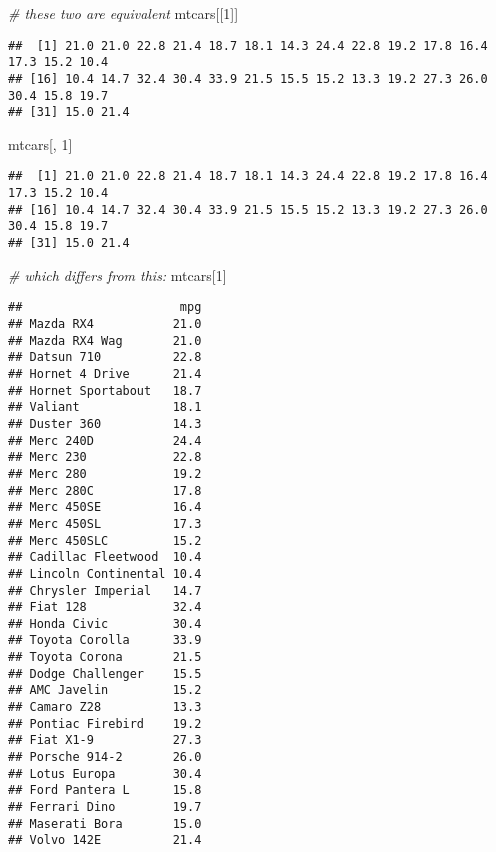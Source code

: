\documentclass[
]{book}
\newenvironment{Shaded}{\begin{snugshade}}{\end{snugshade}}
\newcommand{\CommentTok}[1]{\textcolor[rgb]{0.56,0.35,0.01}{\textit{#1}}}
\newcommand{\DecValTok}[1]{\textcolor[rgb]{0.00,0.00,0.81}{#1}}
\newcommand{\NormalTok}[1]{#1}
\begin{document}
\begin{Shaded}
\begin{Highlighting}[]
\CommentTok{\# these two are equivalent}
\NormalTok{mtcars[[}\DecValTok{1}\NormalTok{]]}
\end{Highlighting}
\end{Shaded}

\begin{verbatim}
##  [1] 21.0 21.0 22.8 21.4 18.7 18.1 14.3 24.4 22.8 19.2 17.8 16.4 17.3 15.2 10.4
## [16] 10.4 14.7 32.4 30.4 33.9 21.5 15.5 15.2 13.3 19.2 27.3 26.0 30.4 15.8 19.7
## [31] 15.0 21.4
\end{verbatim}

\begin{Shaded}
\begin{Highlighting}[]
\NormalTok{mtcars[, }\DecValTok{1}\NormalTok{]}
\end{Highlighting}
\end{Shaded}

\begin{verbatim}
##  [1] 21.0 21.0 22.8 21.4 18.7 18.1 14.3 24.4 22.8 19.2 17.8 16.4 17.3 15.2 10.4
## [16] 10.4 14.7 32.4 30.4 33.9 21.5 15.5 15.2 13.3 19.2 27.3 26.0 30.4 15.8 19.7
## [31] 15.0 21.4
\end{verbatim}

\begin{Shaded}
\begin{Highlighting}[]
\CommentTok{\# which differs from this:}
\NormalTok{mtcars[}\DecValTok{1}\NormalTok{]}
\end{Highlighting}
\end{Shaded}

\begin{verbatim}
##                      mpg
## Mazda RX4           21.0
## Mazda RX4 Wag       21.0
## Datsun 710          22.8
## Hornet 4 Drive      21.4
## Hornet Sportabout   18.7
## Valiant             18.1
## Duster 360          14.3
## Merc 240D           24.4
## Merc 230            22.8
## Merc 280            19.2
## Merc 280C           17.8
## Merc 450SE          16.4
## Merc 450SL          17.3
## Merc 450SLC         15.2
## Cadillac Fleetwood  10.4
## Lincoln Continental 10.4
## Chrysler Imperial   14.7
## Fiat 128            32.4
## Honda Civic         30.4
## Toyota Corolla      33.9
## Toyota Corona       21.5
## Dodge Challenger    15.5
## AMC Javelin         15.2
## Camaro Z28          13.3
## Pontiac Firebird    19.2
## Fiat X1-9           27.3
## Porsche 914-2       26.0
## Lotus Europa        30.4
## Ford Pantera L      15.8
## Ferrari Dino        19.7
## Maserati Bora       15.0
## Volvo 142E          21.4
\end{verbatim}
\end{document}
